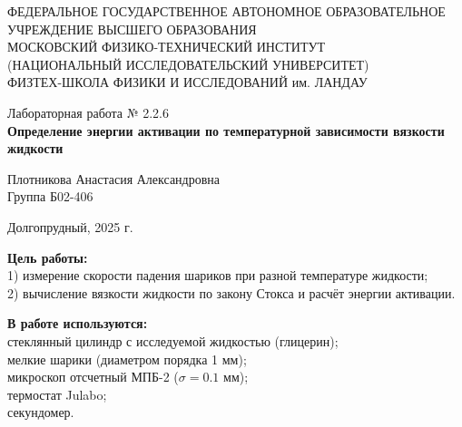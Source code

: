 \documentclass[a4paper,12pt]{article} %
\begin{document}
\begin{center}
	\footnotesize{ФЕДЕРАЛЬНОЕ ГОСУДАРСТВЕННОЕ АВТОНОМНОЕ ОБРАЗОВАТЕЛЬНОЕ 			УЧРЕЖДЕНИЕ ВЫСШЕГО ОБРАЗОВАНИЯ}\\
	\footnotesize{МОСКОВСКИЙ ФИЗИКО-ТЕХНИЧЕСКИЙ ИНСТИТУТ\\(НАЦИОНАЛЬНЫЙ 			ИССЛЕДОВАТЕЛЬСКИЙ УНИВЕРСИТЕТ)}\\
	\footnotesize{ФИЗТЕХ-ШКОЛА ФИЗИКИ И ИССЛЕДОВАНИЙ им. ЛАНДАУ\\}
	\hfill \break
	\hfill \break
	\hfill \break
	\hfill \break
\end{center}

\begin{center}   
    \hfill \break
	\hfill \break
	\hfill \break
	\hfill \break    \hfill \break
	\hfill \break
	\hfill \break
	\hfill \break
    \hfill \break
    \hfill \break
	\hfill \break
	\large{Лабораторная работа № 2.2.6 \\\textbf{Определение энергии активации
	по температурной зависимости вязкости жидкости}}\\
	\begin{flushright}
		Плотникова Анастасия Александровна\\
		Группа Б02-406
	\end{flushright}
	\hfill \break
	\hfill \break
	\hfill \break
\end{center}
\hfill \break
\hfill \break
\hfill \break
\hfill \break
\hfill \break
\hfill \break
\hfill \break
\hfill \break
\hfill \break
\hfill \break
\hfill \break
\hfill \break
\hfill \break
\begin{center}
	Долгопрудный, 2025 г.
\end{center}
\thispagestyle{empty}
\newpage
	\textbf{Цель работы:}\\ 
	1) измерение скорости падения шариков при разной температуре жидкости; \\
	2) вычисление вязкости жидкости по закону Стокса и расчёт энергии активации. \\
	\hfill \break
	
	\textbf{В работе используются:}\\ 
	стеклянный цилиндр с исследуемой жидкостью (глицерин); \\
	мелкие шарики (диаметром порядка 1 мм); \\
	микроскоп отсчетный МПБ-2 ($\sigma = 0.1$ мм); \\
	термостат Julabo; \\
	секундомер. \\
\end{document}
